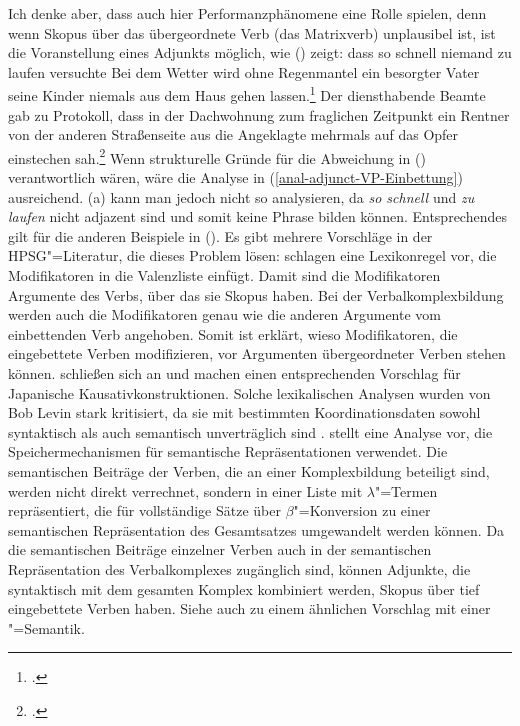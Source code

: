 {Ich denke aber, dass auch hier Performanzphänomene eine Rolle spielen, denn wenn Skopus
über das übergeordnete Verb (das Matrixverb) unplausibel ist, ist die Voranstellung eines Adjunkts möglich, wie
() zeigt:
\eal
\ex dass so schnell niemand zu laufen versuchte
\ex Bei dem Wetter wird ohne Regenmantel ein besorgter Vater seine Kinder niemals aus dem Haus gehen lassen.\footnote{
.
}
\ex Der diensthabende Beamte gab zu Protokoll, dass in der Dachwohnung zum fraglichen Zeitpunkt ein Rentner von der
    anderen Straßenseite aus die Angeklagte mehrmals auf das Opfer einstechen sah.\footnote{
.
}
\zl
Wenn strukturelle Gründe für die Abweichung in () verantwortlich wären, wäre die Analyse in
(\ref{anal-adjunct-VP-Einbettung}) ausreichend. (a) kann man jedoch nicht so analysieren, da
\emph{so schnell} und \emph{zu laufen} nicht adjazent sind und somit keine Phrase bilden
können. Entsprechendes gilt für die anderen Beispiele in (). Es
gibt mehrere Vorschläge in der HPSG"=Literatur, die dieses Problem lösen:  schlagen eine
Lexikonregel vor, die Modifikatoren in die Valenzliste einfügt. Damit sind die Modifikatoren Argumente des
Verbs, über das sie Skopus haben. Bei der Verbalkomplexbildung werden auch die Modifikatoren genau wie die
anderen Argumente vom einbettenden Verb angehoben. Somit ist erklärt, wieso Modifikatoren, die
eingebettete Verben modifizieren, vor Argumenten übergeordneter Verben stehen können. \citet*{MSI99a}
schließen sich \citet{NB94} an und machen einen entsprechenden Vorschlag für
Japanische Kausativkonstruktionen. Solche lexikalischen
Analysen wurden von Bob Levin stark kritisiert, da sie mit bestimmten Koordinationsdaten sowohl
syntaktisch als auch semantisch unverträglich sind
\citep{Levine2003a,LH2006a}. \citet[Abschnitt~6]{Cipollone2001a} stellt eine Analyse vor, die
Speichermechanismen für semantische Repräsentationen verwendet. Die semantischen Beiträge der
Verben, die an einer Komplexbildung beteiligt sind, werden nicht direkt verrechnet, sondern in einer
Liste mit $\lambda$"=Termen repräsentiert, die für vollständige Sätze über $\beta$"=Konversion zu
einer semantischen Repräsentation des Gesamtsatzes umgewandelt werden können. Da die semantischen
Beiträge einzelner Verben auch in der semantischen Repräsentation des Verbalkomplexes zugänglich
sind, können Adjunkte, die syntaktisch mit dem gesamten Komplex kombiniert werden, Skopus über tief
eingebettete Verben haben. Siehe auch \citet{Crysmann2004a} zu einem ähnlichen Vorschlag mit einer \mrs"=Semantik.



}
